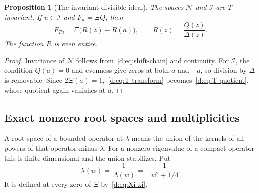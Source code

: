 \documentclass[11pt,a4paper]{article}
\numberwithin{equation}{section}
\newtheorem{proposition}[theorem]{Proposition}
\theoremstyle{definition}\newtheorem{definition}[theorem]{Definition}
\theoremstyle{remark}\newtheorem{remark}[theorem]{Remark}
\newcommand{\Nn}{\mathcal N}\newcommand{\Ii}{\mathcal I}\newcommand{\Zz}{\mathcal Z}
\begin{document}
\begin{proposition}[The invariant divisible ideal]\label{d:prop:T-ideal}
The spaces $\Nn$ and $\Ii$ are $T$-invariant. If $u\in\Ii$ and $F_u=\Xi Q$, then
\begin{equation}\label{d:eq:T-quotient}
 F_{Tu}=\Xi\bigl(R(z)-R(a)\bigr),\qquad
 R(z)=\frac{Q(z)}{\Delta(z)}.
\end{equation}
The function $R$ is even entire.
\end{proposition}
\begin{proof}
Invariance of $\Nn$ follows from~\eqref{d:eq:shift-chain} and continuity. For $\Ii$, the condition $Q(a)=0$ and evenness give zeros at both $a$ and $-a$, so division by $\Delta$ is removable. Since $2\Xi(a)=1$,~\eqref{d:eq:T-transform} becomes~\eqref{d:eq:T-quotient}, whose quotient again vanishes at $a$.
\end{proof}

\subsection{Exact nonzero root spaces and multiplicities}\label{d:sec:roots}

A root space of a bounded operator at $\lambda$ means the union of the kernels of all powers of that operator minus $\lambda$. For a nonzero eigenvalue of a compact operator this is finite dimensional and the union stabilizes. Put
\begin{equation}\label{d:eq:lambda-w}
 \lambda(w)=\frac1{\Delta(w)}=-\frac1{w^2+1/4}.
\end{equation}
It is defined at every zero of $\Xi$ by~\eqref{d:eq:Xi-xi}.
\end{document}

